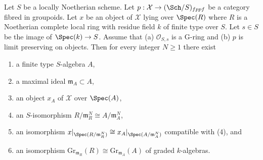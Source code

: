 %
\begin{lemma}
\label{lemma-approximate}
Let $S$ be a locally Noetherian scheme. Let
$p : \mathcal{X} \to (\Sch/S)_{fppf}$ be a category
fibred in groupoids. Let $x$ be an object of
$\mathcal{X}$ lying over $\Spec(R)$ where $R$ is a Noetherian complete
local ring with residue field $k$ of finite type over $S$. Let $s \in S$
be the image of $\Spec(k) \to S$. Assume that (a) $\mathcal{O}_{S, s}$ is
a G-ring and (b) $p$ is limit preserving on objects. Then for every
integer $N \geq 1$ there exist
\begin{enumerate}
\item a finite type $S$-algebra $A$,
\item a maximal ideal $\mathfrak m_A \subset A$,
\item an object $x_A$ of $\mathcal{X}$ over $\Spec(A)$,
\item an $S$-isomorphism $R/\mathfrak m_R^N \cong A/\mathfrak m_A^N$,
\item an isomorphism
$x|_{\Spec(R/\mathfrak m_R^N)} \cong x_A|_{\Spec(A/\mathfrak m_A^N)}$
compatible with (4), and
\item an isomorphism
$\text{Gr}_{\mathfrak m_R}(R) \cong \text{Gr}_{\mathfrak m_A}(A)$
of graded $k$-algebras.
\end{enumerate}
\end{lemma}

